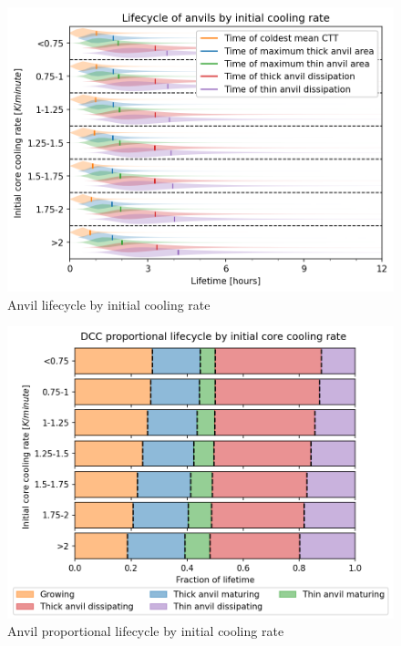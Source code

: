 \begin{figure}[tp]
    \centering
    \includegraphics[width=\textwidth]{figures/ch2_22.png}
    \caption{Anvil lifecycle by initial cooling rate}
    \label{fig:anvil_cooling_rate_lifecycle}
\end{figure}

\begin{figure}[tp]
    \centering
    \includegraphics[width=\textwidth]{figures/ch2_23.png}
    \caption{Anvil proportional lifecycle by initial cooling rate}
    \label{fig:anvil_cooling_rate_proportional_lifecycle}
\end{figure}


